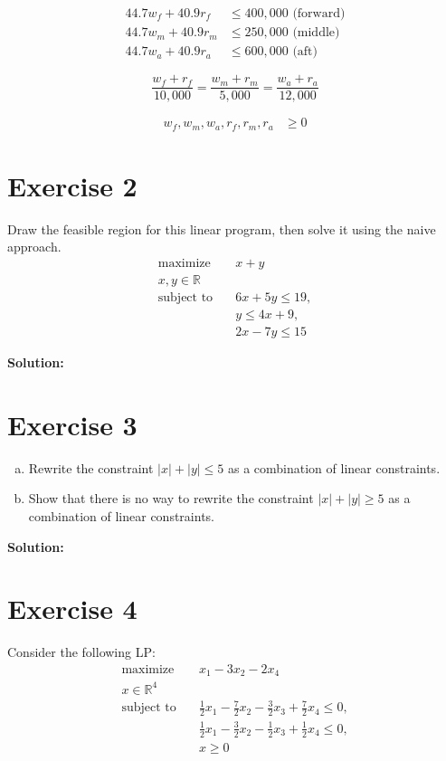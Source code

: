 \documentclass{article}
\begin{document}
\begin{align*}
44.7w_f + 40.9r_f &\leq 400,000 \text{ (forward)} \\
44.7w_m + 40.9r_m &\leq 250,000 \text{ (middle)} \\
44.7w_a + 40.9r_a &\leq 600,000 \text{ (aft)}
\end{align*}

$$
\frac{w_f + r_f}{10,000} = \frac{w_m + r_m}{5,000} = \frac{w_a + r_a}{12,000}
$$

\begin{align*}
w_f, w_m, w_a, r_f, r_m, r_a &\geq 0
\end{align*}

\newpage

\section*{Exercise 2}
Draw the feasible region for this linear program, then solve it using the naive approach.
\begin{align*}
\text{maximize} \quad & x + y \\
x,y \in \mathbb{R} \\
\text{subject to} \quad & 6x + 5y \leq 19, \\
& y \leq 4x + 9, \\
& 2x - 7y \leq 15
\end{align*}

\textbf{Solution: }
\newpage

\section*{Exercise 3}
\begin{enumerate}[(a)]
\item Rewrite the constraint $|x| + |y| \leq 5$ as a combination of linear constraints.
\item Show that there is no way to rewrite the constraint $|x| + |y| \geq 5$ as a combination of linear constraints.
\end{enumerate}

\textbf{Solution: }
\newpage

\section*{Exercise 4}
Consider the following LP:
\begin{align*}
\text{maximize} \quad & x_1 - 3x_2 - 2x_4 \\
x \in \mathbb{R}^4 \\
\text{subject to} \quad & \frac{1}{2}x_1 - \frac{7}{2}x_2 - \frac{3}{2}x_3 + \frac{7}{2}x_4 \leq 0, \\
& \frac{1}{2}x_1 - \frac{3}{2}x_2 - \frac{1}{2}x_3 + \frac{1}{2}x_4 \leq 0, \\
& x \geq 0
\end{align*}
\end{document}
